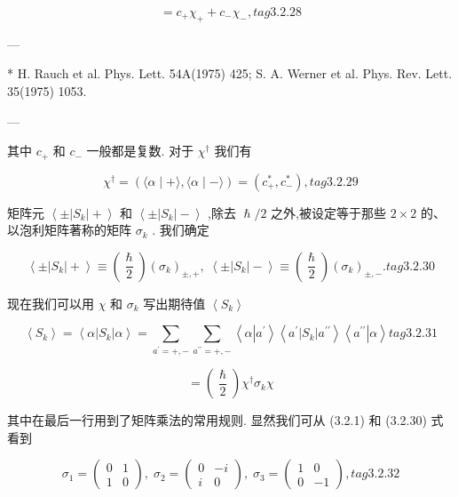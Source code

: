 $$
= {c}_{ + }{\chi }_{ + } + {c}_{ - }{\chi }_{ - }, tag{3.2.28}
$$

---

* H. Rauch et al. Phys. Lett. 54A(1975) 425; S. A. Werner et al. Phys. Rev. Lett. 35(1975) 1053.

---

其中 ${c}_{ + }$ 和 ${c}_{ - }$ 一般都是复数. 对于 ${\chi }^{ \dagger }$ 我们有

$$
{\chi }^{ \dagger } = \left( {\langle \alpha \mid + \rangle ,\langle \alpha \mid - \rangle }\right) = \left( {{c}_{ + }^{ * },{c}_{ - }^{ * }}\right) , tag{3.2.29}
$$

矩阵元 $\left\langle {\pm \left| {S}_{k}\right| + }\right\rangle$ 和 $\left\langle {\pm \left| {S}_{k}\right| - }\right\rangle$ ,除去 $\hslash /2$ 之外,被设定等于那些 $2 \times 2$ 的、以泡利矩阵著称的矩阵 ${\sigma }_{k}$ . 我们确定

$$
\left\langle {\pm \left| {S}_{k}\right| + }\right\rangle \equiv \left( \frac{\hslash }{2}\right) {\left( {\sigma }_{k}\right) }_{\pm , + },\;\left\langle {\pm \left| {S}_{k}\right| - }\right\rangle \equiv \left( \frac{\hslash }{2}\right) {\left( {\sigma }_{k}\right) }_{\pm , - }. tag{3. 2.30}
$$

现在我们可以用 $\chi$ 和 ${\sigma }_{k}$ 写出期待值 $\left\langle {S}_{k}\right\rangle$

$$
\left\langle {S}_{k}\right\rangle = \left\langle {\alpha \left| {S}_{k}\right| \alpha }\right\rangle = \mathop{\sum }\limits_{{{a}^{\prime } = + , - }}\mathop{\sum }\limits_{{{a}^{\prime \prime } = + , - }}\left\langle {\alpha \left| {a}^{\prime }\right\rangle \left\langle {{a}^{\prime }\left| {S}_{k}\right| {a}^{\prime \prime }}\right\rangle \left\langle {a}^{\prime \prime }\right| \alpha }\right\rangle tag{3. 2.31}
$$

$$
= \left( \frac{\hslash }{2}\right) {\chi }^{ \dagger }{\sigma }_{k}\chi
$$

其中在最后一行用到了矩阵乘法的常用规则. 显然我们可从 (3.2.1) 和 (3.2.30) 式看到

$$
{\sigma }_{1} = \left( \begin{array}{ll} 0 & 1 \\ 1 & 0 \end{array}\right) ,\;{\sigma }_{2} = \left( \begin{matrix} 0 & - i \\ i & 0 \end{matrix}\right) ,\;{\sigma }_{3} = \left( \begin{matrix} 1 & 0 \\ 0 & - 1 \end{matrix}\right) , tag{3. 2.32}
$$

